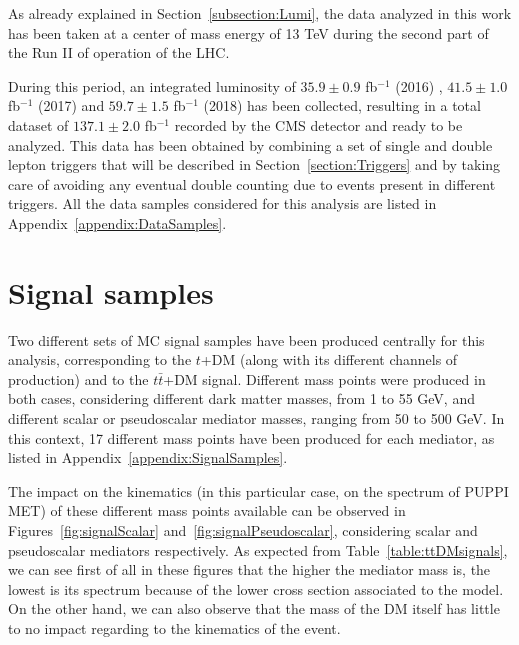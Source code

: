 \documentclass[a4paper, 10pt, openright]{report}
\begin{document}
As already explained in Section~\ref{subsection:Lumi}, the data analyzed in this work has been taken at a center of mass energy of 13 TeV during the second part of the Run II of operation of the \ac{LHC}. 

During this period, an integrated luminosity of $35.9 \pm 0.9$ fb$^{-1}$ (2016) \cite{Lumi2016}, $41.5 \pm 1.0$ fb$^{-1}$ (2017) \cite{Lumi2017} and $59.7 \pm 1.5$ fb$^{-1}$ (2018) \cite{Lumi2018} has been collected, resulting in a total dataset of $137.1 \pm 2.0$ fb$^{-1}$ recorded by the \ac{CMS} detector and ready to be analyzed. This data has been obtained by combining a set of single and double lepton triggers that will be described in Section~\ref{section:Triggers} and by taking care of avoiding any eventual double counting due to events present in different triggers. All the data samples considered for this analysis are listed in Appendix~\ref{appendix:DataSamples}.

\section{Signal samples} \label{section:Signals}

Two different sets of \ac{MC} signal samples have been produced centrally for this analysis, corresponding to the $t$+DM (along with its different channels of production) and to the $t \bar t$+DM signal. Different mass points were produced in both cases, considering different dark matter masses, from 1 to 55 GeV, and different scalar or pseudoscalar mediator masses, ranging from 50 to 500 GeV. In this context, 17 different mass points have been produced for each mediator, as listed in Appendix~\ref{appendix:SignalSamples}.

The impact on the kinematics (in this particular case, on the spectrum of \ac{PUPPI} \ac{MET}) of these different mass points available can be observed in Figures~\ref{fig:signalScalar} and~\ref{fig:signalPseudoscalar}, considering scalar and pseudoscalar mediators respectively. As expected from Table~\ref{table:ttDMsignals}, we can see first of all in these figures that the higher the mediator mass is, the lowest is its spectrum because of the lower cross section associated to the model. On the other hand, we can also observe that the mass of the \ac{DM} itself has little to no impact regarding to the kinematics of the event.
\end{document}
